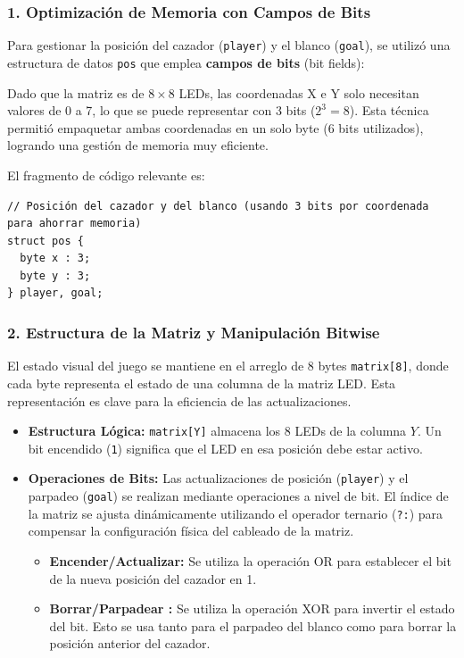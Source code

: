 \subsubsection*{1. Optimización de Memoria con Campos de Bits}

Para gestionar la posición del cazador (\texttt{player}) y el blanco (\texttt{goal}), se utilizó una estructura de datos \texttt{pos} que emplea \textbf{campos de bits} (bit fields):

Dado que la matriz es de $8\times8$ LEDs, las coordenadas X e Y solo necesitan valores de 0 a 7, lo que se puede representar con 3 bits ($2^3=8$). Esta técnica permitió empaquetar ambas coordenadas en un solo byte (6 bits utilizados), logrando una gestión de memoria muy eficiente.

El fragmento de código relevante es:

    \begin{verbatim}
// Posición del cazador y del blanco (usando 3 bits por coordenada para ahorrar memoria)
struct pos {
  byte x : 3;
  byte y : 3;
} player, goal;
    \end{verbatim}


\subsubsection*{2. Estructura de la Matriz y Manipulación Bitwise}

El estado visual del juego se mantiene en el arreglo de 8 bytes \texttt{matrix[8]}, donde cada byte representa el estado de una columna de la matriz LED. Esta representación es clave para la eficiencia de las actualizaciones.

\begin{itemize}
    \item \textbf{Estructura Lógica:} \texttt{matrix[Y]} almacena los 8 LEDs de la columna $Y$. Un bit encendido (\texttt{1}) significa que el LED en esa posición debe estar activo.
    \item \textbf{Operaciones de Bits:} Las actualizaciones de posición (\texttt{player}) y el parpadeo (\texttt{goal}) se realizan mediante operaciones a nivel de bit. El índice de la matriz se ajusta dinámicamente utilizando el operador ternario (\texttt{?:}) para compensar la configuración física del cableado de la matriz.
    \begin{itemize}
        \item \textbf{Encender/Actualizar:} Se utiliza la operación OR  para establecer el bit de la nueva posición del cazador en 1.
        \item \textbf{Borrar/Parpadear :} Se utiliza la operación XOR para invertir el estado del bit. Esto se usa tanto para el parpadeo del blanco como para borrar la posición anterior del cazador.
    \end{itemize}
\end{itemize}



